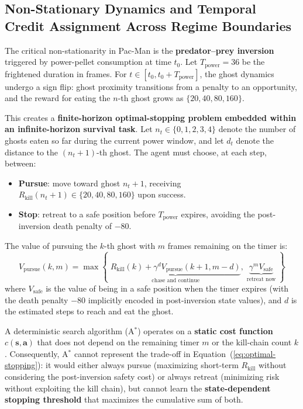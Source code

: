 \documentclass[11pt,a4paper]{article}
\theoremstyle{definition}
\begin{document}
\subsection{Non-Stationary Dynamics and Temporal Credit Assignment Across Regime Boundaries}

The critical non-stationarity in Pac-Man is the \textbf{predator--prey inversion} triggered by power-pellet consumption at time $t_0$.
Let $T_{\text{power}} = 36$ be the frightened duration in frames.
For $t \in [t_0, t_0 + T_{\text{power}}]$, the ghost dynamics undergo a sign flip: ghost proximity transitions from a penalty to an opportunity, and the reward for eating the $n$-th ghost grows as $\{20, 40, 80, 160\}$.

This creates a \textbf{finite-horizon optimal-stopping problem embedded within an infinite-horizon survival task}.
Let $n_t \in \{0, 1, 2, 3, 4\}$ denote the number of ghosts eaten so far during the current power window, and let $d_t$ denote the distance to the $(n_t+1)$-th ghost.
The agent must choose, at each step, between:
\begin{itemize}[nosep]
    \item \textbf{Pursue}: move toward ghost $n_t+1$, receiving $R_{\text{kill}}(n_t+1) \in \{20, 40, 80, 160\}$ upon success.
    \item \textbf{Stop}: retreat to a safe position before $T_{\text{power}}$ expires, avoiding the post-inversion death penalty of $-80$.
\end{itemize}

The value of pursuing the $k$-th ghost with $m$ frames remaining on the timer is:
\begin{equation}
V_{\text{pursue}}(k, m) = \max\left\{ \; \underbrace{R_{\text{kill}}(k) + \gamma^{d} V_{\text{pursue}}(k+1, m-d)}_{\text{chase and continue}},\; \underbrace{\gamma^{m} V_{\text{safe}}}_{\text{retreat now}} \; \right\}
\label{eq:optimal-stopping}
\end{equation}
where $V_{\text{safe}}$ is the value of being in a safe position when the timer expires (with the death penalty $-80$ implicitly encoded in post-inversion state values), and $d$ is the estimated steps to reach and eat the ghost.

A deterministic search algorithm (A$^*$) operates on a \textbf{static cost function} $c(\mathbf{s}, \mathbf{a})$ that does not depend on the remaining timer $m$ or the kill-chain count $k$.
Consequently, A$^*$ cannot represent the trade-off in Equation~(\ref{eq:optimal-stopping}): it would either always pursue (maximizing short-term $R_{\text{kill}}$ without considering the post-inversion safety cost) or always retreat (minimizing risk without exploiting the kill chain), but cannot learn the \textbf{state-dependent stopping threshold} that maximizes the cumulative sum of both.
\end{document}
